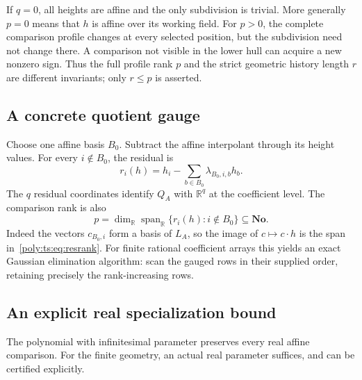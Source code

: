 \documentclass[11pt,a4paper]{article}
\numberwithin{equation}{section}
\theoremstyle{plain}
\newcommand{\No}{\mathbf{No}}
\newcommand{\R}{\mathbb R}
\newcommand{\spanR}{\operatorname{span}_{\R}}
\begin{document}
\begin{remark}\label{poly:ts:rem:invisible}
If $q=0$, all heights are affine and the only subdivision is trivial.
More generally $p=0$ means that $h$ is affine over its working field.
For $p>0$, the complete comparison profile changes at every selected
position, but the subdivision need not change there. A comparison not
visible in the lower hull can acquire a new nonzero sign. Thus the full
profile rank $p$ and the strict geometric history length $r$ are different
invariants; only $r\le p$ is asserted.
\end{remark}

\subsection{A concrete quotient gauge}
Choose one affine basis $B_0$. Subtract the affine interpolant through its
height values. For every $i\notin B_0$, the residual is
\begin{equation}\label{poly:ts:eq:gauge}
 r_i(h)=h_i-\sum_{b\in B_0}\lambda_{B_0,i,b}h_b.
\end{equation}
The $q$ residual coordinates identify $Q_A$ with $\R^q$ at the coefficient
level. The comparison rank is also
\begin{equation}\label{poly:ts:eq:resrank}
 p=\dim_\R\spanR\{r_i(h):i\notin B_0\}\subseteq\No.
\end{equation}
Indeed the vectors $c_{B_0,i}$ form a basis of $L_A$, so the image of
$c\mapsto c\cdot h$ is the span in~\eqref{poly:ts:eq:resrank}.
For finite rational coefficient arrays this yields an exact Gaussian
elimination algorithm: scan the gauged rows in their supplied order,
retaining precisely the rank-increasing rows.

\subsection{An explicit real specialization bound}\label{poly:ts:sec:epsilon}
The polynomial with infinitesimal parameter preserves every real affine
comparison. For the finite geometry, an actual real parameter suffices,
and can be certified explicitly.
\end{document}
